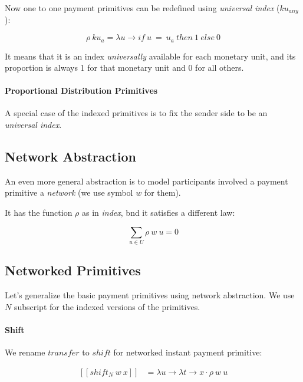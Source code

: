 Now one to one payment primitives can be redefined using \textit{universal index} ($ku_{any}$):

\begin{equation}
    \rho\ ku_{a} = \lambda u \rightarrow if\ u\ =\ u_a\ then\ 1\ else\ 0
\end{equation}

It means that it is an index \textit{universally} available for each monetary unit, and its
proportion is always 1 for that monetary unit and 0 for all others.

\paragraph{Proportional Distribution Primitives}

A special case of the indexed primitives is to fix the sender side to be an \textit{universal
index}.

\subsection{Network Abstraction}

An even more general abstraction is to model participants involved a payment primitive
a \textit{network} (we use symbol $w$ for them).

It has the function $\rho$ as in \textit{index}, bnd it satisfies a different law:

\begin{equation}
    \displaystyle \sum_{u \in U} \rho\ w\ u = 0
\end{equation}

\subsection{Networked Primitives}

Let's generalize the basic payment primitives using network abstraction. We use $N$ subscript for
the indexed versions of the primitives.

\paragraph{Shift}

We rename $transfer$ to $shift$ for networked instant payment primitive:

\begin{equation}
    \begin{split}
        [\![shift_N\ w\ x]\!] &=
        \lambda u \rightarrow \lambda t \rightarrow x \cdot \rho\ w\ u
    \end{split}
\end{equation}

